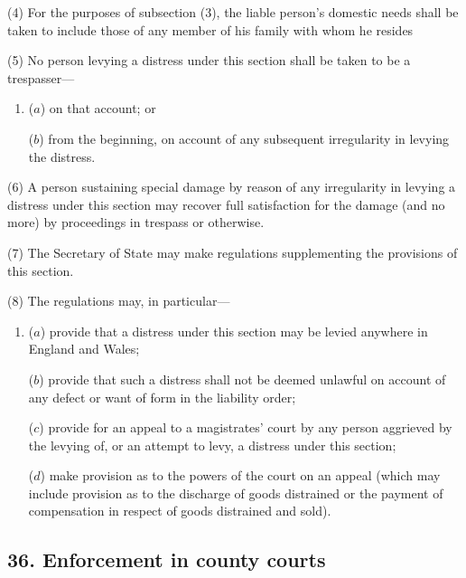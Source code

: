 \documentclass[a4paper]{article}
\begin{document}
(4) For the purposes of subsection (3), the liable person’s domestic needs shall be 
taken to include those of any member of his family with whom he resides

(5) No person levying a distress under this section shall be taken to be a trespasser---
\begin{enumerate}\item[]
 ($a$) on that account; or 

($b$) from the beginning, on account of any subsequent irregularity in levying the distress.
\end{enumerate}

(6) A person sustaining special damage by reason of any irregularity in levying a distress under this section may recover full satisfaction for the damage (and no more) by proceedings in trespass or otherwise.

(7) The Secretary of State may make regulations supplementing the provisions of this section.

(8) The regulations may, in particular---
\begin{enumerate}\item[]
 ($a$) provide that a distress under this section may be levied anywhere in England and Wales;

($b$) provide that such a distress shall not be deemed unlawful on account of any defect or want of form in the liability order;

($c$) provide for an appeal to a magistrates’ court by any person aggrieved by the levying of, or an attempt to levy, a distress under this section;

($d$) make provision as to the powers of the court on an appeal (which may include provision as to the discharge of goods distrained or the payment of compensation in respect of goods distrained and sold).
\end{enumerate}


\subsection{36. Enforcement in county courts}
\end{document}
